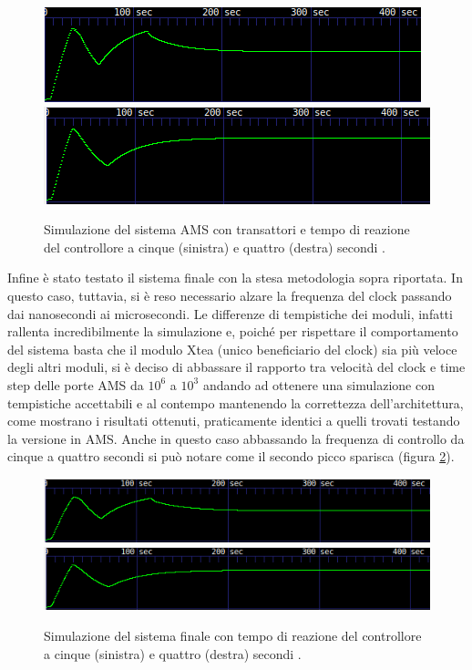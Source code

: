 \documentclass[]{IEEEtran}
\begin{document}
\begin{figure}[htb]
	\centering
	\includegraphics[width=\columnwidth]{Images/AMS-5sec.png}
	\endminipage\hfill
	\includegraphics[width=\columnwidth]{Images/AMS-4sec.png}
	\endminipage\hfill
	\centering

	\caption{Simulazione del sistema AMS con transattori e tempo di reazione del controllore a cinque (sinistra) e quattro (destra) secondi .}
	\label{ams}
\end{figure}
Infine è stato testato il sistema finale con la stesa metodologia sopra riportata. In questo caso, tuttavia, si è reso necessario alzare la frequenza del clock passando dai nanosecondi ai microsecondi. Le differenze di tempistiche dei moduli, infatti rallenta incredibilmente la simulazione e, poiché per rispettare il comportamento del sistema basta che il modulo Xtea (unico beneficiario del clock) sia più veloce degli altri moduli, si è deciso di abbassare il rapporto tra velocità del clock e time step delle porte AMS da $10^6$ a $10^3$ andando ad ottenere una simulazione con tempistiche accettabili e al contempo mantenendo la correttezza dell'architettura, come mostrano i risultati ottenuti, praticamente identici a quelli trovati testando la versione in AMS. Anche in questo caso abbassando la frequenza di controllo da cinque a quattro secondi si può notare come il secondo picco sparisca (figura \ref{het}).
\begin{figure}[htb]
	\centering
	\includegraphics[width=\columnwidth]{Images/heterogeneus_5sec.png}
	\endminipage\hfill
	\includegraphics[width=\columnwidth]{Images/heterogeneus_4sec.png}
	\endminipage\hfill
	\centering

	\caption{Simulazione del sistema finale con tempo di reazione del controllore a cinque (sinistra) e quattro (destra) secondi .}
	\label{het}
\end{figure}
\end{document}
